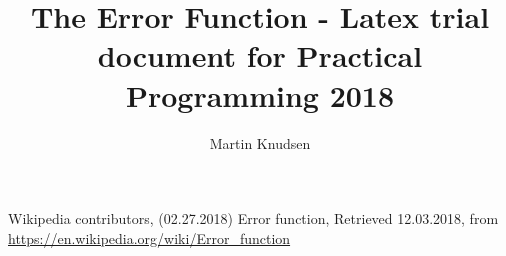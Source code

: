 \documentclass{report}
\author{Martin Knudsen}
\title{The Error Function - Latex trial document for Practical Programming 2018}
\begin{document}
\maketitle



\begin{thebibliography}{9}

Wikipedia contributors, 
(02.27.2018) Error function, Retrieved 12.03.2018, 
from \url{https://en.wikipedia.org/wiki/Error_function}

\end{thebibliography}
\end{document}
